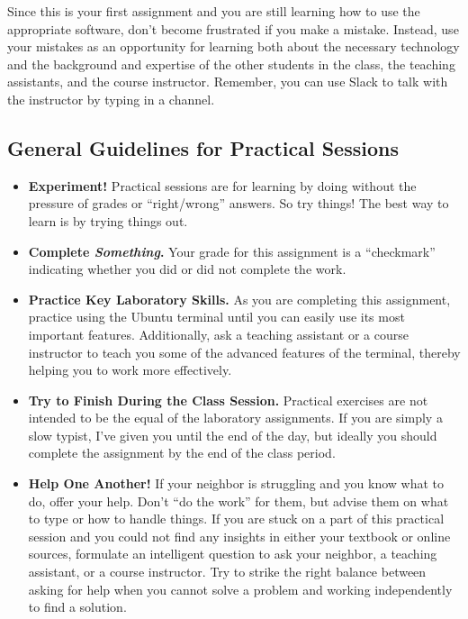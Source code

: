 \noindent Since this is your first  assignment and you are still learning how to use the appropriate software,
    don't become frustrated if you make a mistake. Instead, use your mistakes as an opportunity for learning both about
    the necessary technology and the background and expertise of the other students in the class, the teaching
    assistants, and the course instructor. Remember, you can use Slack to talk with the instructor by typing
     in a channel.
 

\subsection*{General Guidelines for Practical Sessions}
\begin{itemize}
\item {\bf Experiment!} Practical sessions are for learning by doing without the pressure of grades or ``right/wrong''
  answers. So try things!  The best way to learn is by trying things out.

\item {\bf Complete \textbf{\textit{Something}}.} Your grade for this assignment is a ``checkmark'' indicating whether you
  did or did not complete the work.

\item {\bf Practice Key Laboratory Skills.} As you are completing this assignment, practice using the Ubuntu terminal until you can easily use its most important features.  Additionally, ask
  a teaching assistant or a course instructor to teach you some of the advanced features of the terminal, thereby helping you to work more effectively. 

\item {\bf Try to Finish During the Class Session.} Practical exercises are not intended to be the equal of the
  laboratory assignments. If you are simply a slow typist, I've given you until the end of the day, but ideally you
  should complete the assignment by the end of the class period. 

\item {\bf Help One Another!} If your neighbor is struggling and you know what to do, offer your help. Don't ``do the
  work'' for them, but advise them on what to type or how to handle things. If you are stuck on a part of this practical
  session and you could not find any insights in either your textbook or online sources, formulate an intelligent
  question to ask your neighbor, a teaching assistant, or a course instructor. Try to strike the right balance between
  asking for help when you cannot solve a problem and working independently to find a solution.
\end{itemize}



